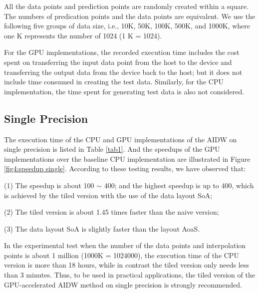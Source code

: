 \documentclass[fleqn,11pt]{wlscirep}
\begin{document}
All the data points and prediction points are randomly created within a 
square. The numbers of predication points and the data points are 
equivalent. We use the following five groups of data size, i.e., 10K, 50K, 
100K, 500K, and 1000K, where one K represents the number of 1024 (1 K = 
1024). 

For the GPU implementations, the recorded execution time includes the cost 
spent on transferring the input data point from the host to the device and 
transferring the output data from the device back to the host; but it does 
not include time consumed in creating the test data. Similarly, for the CPU 
implementation, the time spent for generating test data is also not 
considered.

\subsection{Single Precision}
The execution time of the CPU and GPU implementations of the AIDW on single 
precision is listed in Table \ref{tab1}. And the speedups of the GPU implementations 
over the baseline CPU implementation are illustrated in Figure \ref{fig4:speedup single}. According 
to these testing results, we have observed that:

(1) The speedup is about 100 $\sim $ 400; and the highest speedup is up to 
400, which is achieved by the tiled version with the use of the data layout 
SoA;

(2) The tiled version is about 1.45 times faster than the naive version;

(3) The data layout SoA is slightly faster than the layout AoaS.

In the experimental test when the number of the data points and 
interpolation points is about 1 million (1000K = 1024000), the execution 
time of the CPU version is more than 18 hours, while in contrast the tiled 
version only needs less than 3 minutes. Thus, to be used in practical 
applications, the tiled version of the GPU-accelerated AIDW method on single 
precision is strongly recommended.
\end{document}
